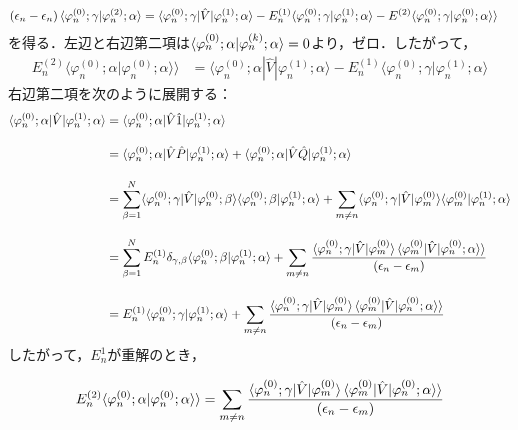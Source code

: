 \begin{align}
(\epsilon_n-\epsilon_n)\braket{\varphi^{(0)}_n;\gamma|\varphi^{(2)}_n;\alpha}
&=\langle{\varphi^{(0)}_n;\gamma|\hat{V}|\varphi^{(1)}_n;\alpha}\rangle
-E^{(1)}_n\langle{\varphi^{(0)}_n;\gamma|\varphi^{(1)}_n;\alpha}\rangle
-E^{(2)}\langle{\varphi^{(0)}_n;\gamma|\varphi^{(0)}_n;\alpha}\rangle\rangle
%
\end{align}
を得る．左辺と右辺第二項は$\braket{\varphi^{(0)}_n;\alpha|\varphi^{(k)}_n;\alpha}=0$より，ゼロ．したがって，
\begin{align}
E^{(2)}_n\langle{\varphi^{(0)}_n;\alpha|\varphi^{(0)}_n;\alpha}\rangle\rangle
&=\langle{\varphi^{(0)}_n;\alpha|\hat{V}|\varphi^{(1)}_n;\alpha}\rangle
-E^{(1)}_n\langle{\varphi^{(0)}_n;\gamma|\varphi^{(1)}_n;\alpha}\rangle
%
\end{align}
右辺第二項を次のように展開する：
\begin{align}
\langle{\varphi^{(0)}_n;\alpha|\hat{V}|\varphi^{(1)}_n;\alpha}\rangle
&=\langle{\varphi^{(0)}_n;\alpha|\hat{V}\hat{1}|\varphi^{(1)}_n;\alpha}\rangle\nn[10pt]
&=\langle{\varphi^{(0)}_n;\alpha|\hat{V}\hat{P}|\varphi^{(1)}_n;\alpha}\rangle
+\langle{\varphi^{(0)}_n;\alpha|\hat{V}\hat{Q}|\varphi^{(1)}_n;\alpha}\rangle\nn[10pt]
%
&=\sum_{\beta=1}^{N}\langle{\varphi^{(0)}_n;\gamma|\hat{V}|\varphi^{(0)}_n;\beta}\rangle
\langle{\varphi^{(0)}_n;\beta|\varphi^{(1)}_n;\alpha}\rangle
+\sum_{m\neq n}\langle{\varphi^{(0)}_n;\gamma|\hat{V}|\varphi^{(0)}_m}\rangle
\langle{\varphi^{(0)}_m|\varphi^{(1)}_n;\alpha}\rangle\nn[10pt]
%
&=\sum_{\beta=1}^{N}E^{(1)}_n \delta_{\gamma,\beta}
\langle{\varphi^{(0)}_n;\beta|\varphi^{(1)}_n;\alpha}\rangle
+\sum_{m\neq n}\frac{\langle{\varphi^{(0)}_n;\gamma|\hat{V}|\varphi^{(0)}_m}\rangle
    \braket{\varphi^{(0)}_{m}|\hat{V}|\varphi^{(0)}_n;\alpha}\rangle}{(\epsilon_n-\epsilon_m)}\nn[10pt]
%
&=E^{(1)}_n 
\langle{\varphi^{(0)}_n;\gamma|\varphi^{(1)}_n;\alpha}\rangle
+\sum_{m\neq n}\frac{\langle{\varphi^{(0)}_n;\gamma|\hat{V}|\varphi^{(0)}_m}\rangle
    \braket{\varphi^{(0)}_{m}|\hat{V}|\varphi^{(0)}_n;\alpha}\rangle}{(\epsilon_n-\epsilon_m)}
\end{align}
したがって，$E^{1}_{n}$が重解のとき，

\begin{equation}
    E^{(2)}_n \langle{\varphi^{(0)}_n;\alpha|\varphi^{(0)}_n;\alpha}\rangle\rangle
    =\sum_{m\neq n}\frac{\langle{\varphi^{(0)}_n;\gamma|\hat{V}|\varphi^{(0)}_m}\rangle
    \braket{\varphi^{(0)}_{m}|\hat{V}|\varphi^{(0)}_n;\alpha}\rangle}{(\epsilon_n-\epsilon_m)}
\end{equation}

